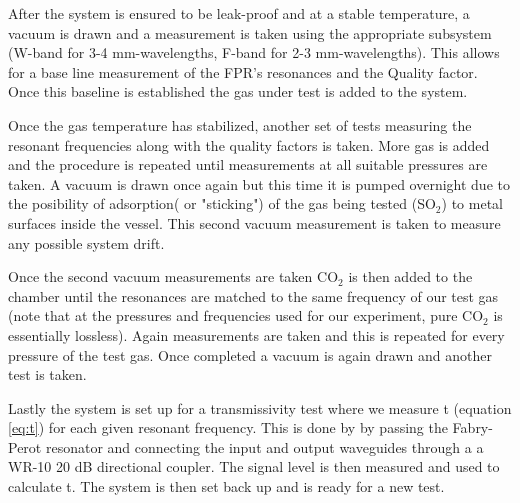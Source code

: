 After the system is ensured to be leak-proof and at a stable temperature, a vacuum is drawn and a measurement is taken using the appropriate subsystem (W-band for 3-4 mm-wavelengths, F-band for 2-3 mm-wavelengths). This allows for a base line measurement of the FPR's resonances and the Quality factor. Once this baseline is established the gas under test is added to the system.

Once the gas temperature has stabilized, another set of tests measuring the resonant frequencies along with the quality factors is taken. More gas is added and the procedure is repeated until measurements at all suitable pressures are taken. A vacuum is drawn once again but this time it is pumped overnight due to the posibility of adsorption( or "sticking") of the gas being tested (SO$_2$) to metal surfaces inside the vessel. This second vacuum measurement is taken to measure any possible system drift.

Once the second vacuum measurements are taken CO$_2$ is then added to the chamber until the resonances are matched to the same frequency of our test gas (note that at the pressures and frequencies used for our experiment, pure CO$_2$ is essentially lossless). Again measurements are taken and this is repeated for every pressure of the test gas. Once completed a vacuum is again drawn and another test is taken. 

Lastly the system is set up for a transmissivity test where we measure t (equation \ref{eq:t}) for each given resonant frequency. This is done by by passing the Fabry-Perot resonator and connecting the input and output waveguides through a a WR-10 20 dB directional coupler. The signal level is then measured and used to calculate t.  The system is then set back up and is ready for a new test. %

